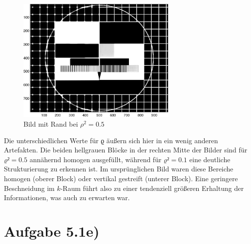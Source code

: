 \begin{figure}[htb]
\centering
  \includegraphics[width=0.7\textwidth,keepaspectratio]{../tmp/eins_d_0_5-crop.pdf}
  \caption{Bild mit Rand bei $ρ^2 = 0.5$}
  \label{fig:kreis_0_5}
\end{figure}

Die unterschiedlichen Werte für ϱ äußern sich hier in ein wenig anderen Artefakten. 
Die beiden hellgrauen Blöcke in der rechten Mitte der Bilder sind für $ϱ²=0.5$
annähernd homogen ausgefüllt, während für $ϱ²=0.1$ eine deutliche Strukturierung
zu erkennen ist. Im ursprünglichen Bild waren diese Bereiche homogen (oberer Block)
oder vertikal gestreift (unterer Block). Eine geringere Beschneidung im $k$-Raum
führt also zu einer tendenziell größeren Erhaltung der Informationen, was auch zu
erwarten war.

\section*{Aufgabe 5.1e)}